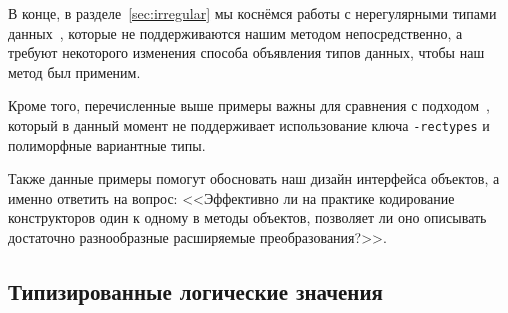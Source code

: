 В конце, в разделе~\ref{sec:irregular} мы коснёмся работы с нерегулярными типами данных~\cite{irregular}, которые не поддерживаются нашим методом непосредственно, а требуют некоторого изменения способа объявления типов данных, чтобы наш метод был применим. %


Кроме того, перечисленные выше примеры важны для сравнения с подходом~\cite{Visitors}, который 
 в данный момент не поддерживает использование ключа \texttt{-rectypes} и полиморфные вариантные типы. 

Также данные примеры помогут обосновать наш дизайн  интерфейса объектов, а именно ответить на вопрос: <<Эффективно ли  на практике кодирование конструкторов один к одному в методы объектов, позволяет ли оно описывать достаточно разнообразные расширяемые преобразования?>>.







\subsection{Типизированные логические значения}
\label{sec:lists}

